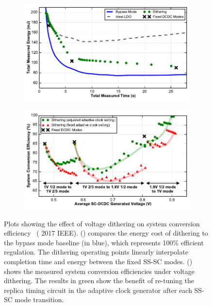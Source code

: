 \documentclass[graybox]{svmult}
\begin{document}
\begin{figure}
  \centering
  \begin{subfigure}[t]{0.8\textwidth}
  \centering
  \includegraphics[width=\textwidth]{6-raven4-voltage-dithering-a}
  \caption{}
  \label{fig:6-raven4-voltage-dithering-a}
  \end{subfigure}
  \par\bigskip
  \begin{subfigure}[t]{0.8\textwidth}
  \centering
  \includegraphics[width=\textwidth]{6-raven4-voltage-dithering-b}
  \caption{}
  \label{fig:6-raven4-voltage-dithering-b}
  \end{subfigure}
  \caption{Plots showing the effect of voltage dithering on system conversion efficiency~\cite{Keller2017} ({\textcopyright} 2017 IEEE).  () compares the energy cost of dithering to the bypass mode baseline (in blue), which represents 100\% efficient regulation.  The dithering operating points linearly interpolate completion time and energy between the fixed SS-SC modes.  () shows the measured system conversion efficiencies under voltage dithering.  The results in green show the benefit of re-tuning the replica timing circuit in the adaptive clock generator after each SS-SC mode transition.}
  \label{fig:6-raven4-voltage-dithering}
\end{figure}
\end{document}
